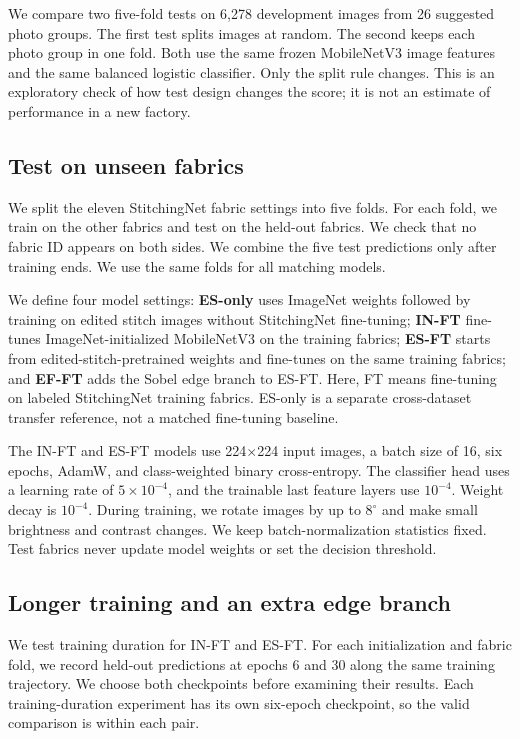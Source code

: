 \documentclass[conference,a4paper]{IEEEtran}
\begin{document}
We compare two five-fold tests on 6,278 development images from 26 suggested photo groups. The first test splits images at random. The second keeps each photo group in one fold. Both use the same frozen MobileNetV3 image features and the same balanced logistic classifier. Only the split rule changes. This is an exploratory check of how test design changes the score; it is not an estimate of performance in a new factory.

\subsection{Test on unseen fabrics}
We split the eleven StitchingNet fabric settings into five folds. For each fold, we train on the other fabrics and test on the held-out fabrics. We check that no fabric ID appears on both sides. We combine the five test predictions only after training ends. We use the same folds for all matching models.

We define four model settings: \textbf{ES-only} uses ImageNet weights followed by training on edited stitch images without StitchingNet fine-tuning; \textbf{IN-FT} fine-tunes ImageNet-initialized MobileNetV3 on the training fabrics; \textbf{ES-FT} starts from edited-stitch-pretrained weights and fine-tunes on the same training fabrics; and \textbf{EF-FT} adds the Sobel edge branch to ES-FT. Here, FT means fine-tuning on labeled StitchingNet training fabrics. ES-only is a separate cross-dataset transfer reference, not a matched fine-tuning baseline.

The IN-FT and ES-FT models use 224$\times$224 input images, a batch size of 16, six epochs, AdamW, and class-weighted binary cross-entropy. The classifier head uses a learning rate of $5\times10^{-4}$, and the trainable last feature layers use $10^{-4}$. Weight decay is $10^{-4}$. During training, we rotate images by up to $8^{\circ}$ and make small brightness and contrast changes. We keep batch-normalization statistics fixed. Test fabrics never update model weights or set the decision threshold.

\subsection{Longer training and an extra edge branch}
We test training duration for IN-FT and ES-FT. For each initialization and fabric fold, we record held-out predictions at epochs 6 and 30 along the same training trajectory. We choose both checkpoints before examining their results. Each training-duration experiment has its own six-epoch checkpoint, so the valid comparison is within each pair.
\end{document}
